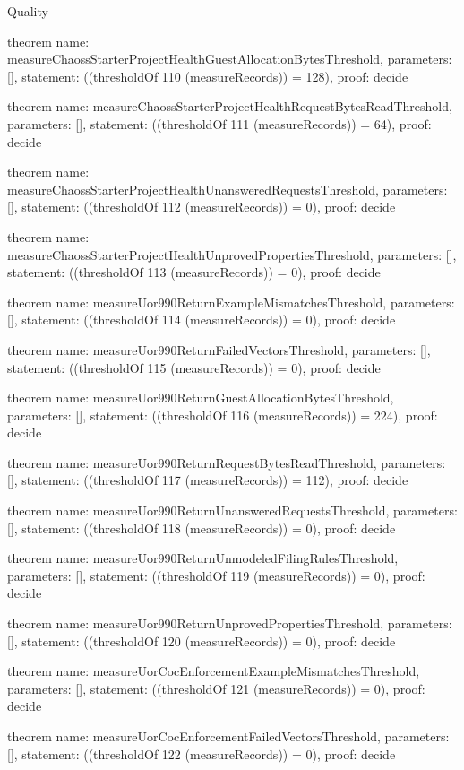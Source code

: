 \begin{lexlean}{Quality}
\begin{semanticmodule}
theorem{
  name: measureChaossStarterProjectHealthGuestAllocationBytesThreshold,
  parameters: [],
  statement: ((thresholdOf 110 (measureRecords)) = 128),
  proof: decide{}
}

theorem{
  name: measureChaossStarterProjectHealthRequestBytesReadThreshold,
  parameters: [],
  statement: ((thresholdOf 111 (measureRecords)) = 64),
  proof: decide{}
}

theorem{
  name: measureChaossStarterProjectHealthUnansweredRequestsThreshold,
  parameters: [],
  statement: ((thresholdOf 112 (measureRecords)) = 0),
  proof: decide{}
}

theorem{
  name: measureChaossStarterProjectHealthUnprovedPropertiesThreshold,
  parameters: [],
  statement: ((thresholdOf 113 (measureRecords)) = 0),
  proof: decide{}
}

theorem{
  name: measureUor990ReturnExampleMismatchesThreshold,
  parameters: [],
  statement: ((thresholdOf 114 (measureRecords)) = 0),
  proof: decide{}
}

theorem{
  name: measureUor990ReturnFailedVectorsThreshold,
  parameters: [],
  statement: ((thresholdOf 115 (measureRecords)) = 0),
  proof: decide{}
}

theorem{
  name: measureUor990ReturnGuestAllocationBytesThreshold,
  parameters: [],
  statement: ((thresholdOf 116 (measureRecords)) = 224),
  proof: decide{}
}

theorem{
  name: measureUor990ReturnRequestBytesReadThreshold,
  parameters: [],
  statement: ((thresholdOf 117 (measureRecords)) = 112),
  proof: decide{}
}

theorem{
  name: measureUor990ReturnUnansweredRequestsThreshold,
  parameters: [],
  statement: ((thresholdOf 118 (measureRecords)) = 0),
  proof: decide{}
}

theorem{
  name: measureUor990ReturnUnmodeledFilingRulesThreshold,
  parameters: [],
  statement: ((thresholdOf 119 (measureRecords)) = 0),
  proof: decide{}
}

theorem{
  name: measureUor990ReturnUnprovedPropertiesThreshold,
  parameters: [],
  statement: ((thresholdOf 120 (measureRecords)) = 0),
  proof: decide{}
}

theorem{
  name: measureUorCocEnforcementExampleMismatchesThreshold,
  parameters: [],
  statement: ((thresholdOf 121 (measureRecords)) = 0),
  proof: decide{}
}

theorem{
  name: measureUorCocEnforcementFailedVectorsThreshold,
  parameters: [],
  statement: ((thresholdOf 122 (measureRecords)) = 0),
  proof: decide{}
}


\end{semanticmodule}
\end{lexlean}
